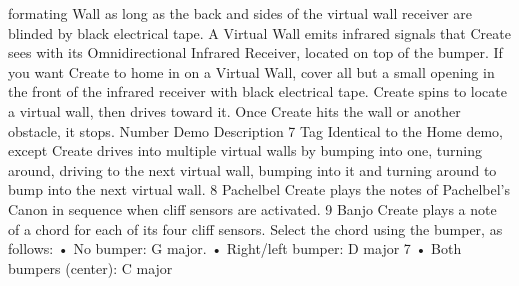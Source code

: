 
\begin{DoxyRefList}
\item[\label{todo__todo000001}%
\hypertarget{todo__todo000001}{}%
global\+Scope$>$ Global \hyperlink{group__roomba-lib_gga305e17dfb7050ad83ea49ded2e6a2e24a4009137101f5f5008ebb98e6bb7c3436}{R\+O\+O\+M\+B\+A\+\_\+\+D\+E\+M\+O} ]formating Wall as long as the back and sides of the virtual wall receiver are blinded by black electrical tape. A Virtual Wall emits infrared signals that Create sees with its Omnidirectional Infrared Receiver, located on top of the bumper. If you want Create to home in on a Virtual Wall, cover all but a small opening in the front of the infrared receiver with black electrical tape. Create spins to locate a virtual wall, then drives toward it. Once Create hits the wall or another obstacle, it stops. Number Demo Description 7 Tag Identical to the Home demo, except Create drives into multiple virtual walls by bumping into one, turning around, driving to the next virtual wall, bumping into it and turning around to bump into the next virtual wall. 8 Pachelbel Create plays the notes of Pachelbel’s Canon in sequence when cliff sensors are activated. 9 Banjo Create plays a note of a chord for each of its four cliff sensors. Select the chord using the bumper, as follows\+: • No bumper\+: G major. • Right/left bumper\+: D major 7 • Both bumpers (center)\+: C major
\end{DoxyRefList}